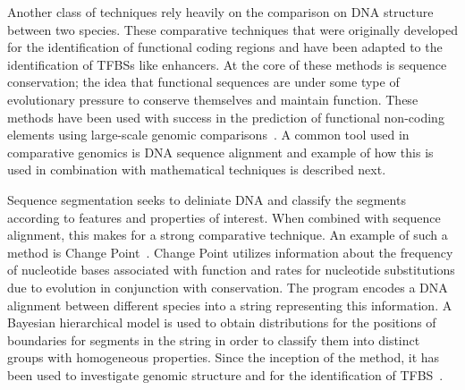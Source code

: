         Another class of techniques rely heavily on the comparison on DNA structure between two species.
        These comparative techniques that were originally developed for the identification of functional coding regions and have been adapted to the identification of TFBSs like enhancers. At the core of these methods is sequence conservation; the idea that functional sequences are under some type of evolutionary pressure to conserve themselves and maintain function. These methods have been used with success in the prediction of functional non-coding elements using large-scale genomic comparisons~\cite{aparicio2002whole, gottgens2000analysis, loots2000identification, mouse2002initial}. A common tool used in comparative genomics is DNA sequence alignment and example of how this is used in combination with mathematical techniques is described next.

        
        Sequence segmentation seeks to deliniate DNA and classify the segments according to features and properties of interest. When combined with sequence alignment, this makes for a strong comparative technique.
        An example of such a method is Change Point~\cite{keith2006segmenting}. Change Point utilizes information about the frequency of nucleotide bases associated with function and rates for nucleotide substitutions due to evolution in conjunction with conservation. The program encodes a DNA alignment between different species into a string representing this information. A Bayesian hierarchical model is used to obtain distributions for the positions of boundaries for segments in the string in order to classify them into distinct groups with homogeneous properties. Since the inception of the method, it has been used to investigate genomic structure and for the identification of TFBS~\cite{algama2014investigating, algama2017genome}. 
        
